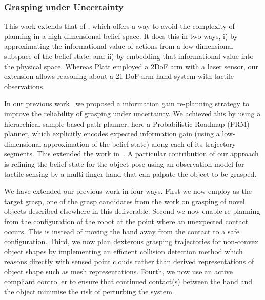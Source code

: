 
\subsubsection{Grasping under Uncertainty}
\label{sec:GraspingUncertainty}

 This work extends that of \cite{bib:platt_csail_2011}, which offers a way to avoid the complexity of planning in a high dimensional belief space. It does this in two ways, i) by approximating the informational value of actions from a low-dimensional subspace of the belief state; and ii) by embedding that informational value into the physical space. Whereas Platt employed a 2DoF arm with a laser sensor, our extension allows reasoning about a 21 DoF arm-hand system with tactile observations. 

In our previous work~\cite{bib:zito_workshop_iros2012,bib:zito_iros_2013} we proposed a information gain re-planning strategy to improve the reliability of grasping under uncertainty. We achieved this by using a hierarchical sample-based path planner, here a Probabilistic Roadmap (PRM) planner, which explicitly encodes expected information gain (using a low-dimensional approximation of the belief state) along each of its trajectory segments. This extended the work in~\cite{bib:platt_csail_2011}. A particular contribution of our approach is refining the belief state for the object pose using an observation model for tactile sensing by a multi-finger hand that can palpate the object to be grasped. 

We have extended our previous work in four ways. First we now employ as the target grasp, one of the grasp candidates from the work on grasping of novel objects described elsewhere in this deliverable. Second we now enable re-planning from the configuration of the robot at the point where an unexpected contact occurs. This is instead of moving the hand away from the contact to a safe configuration. Third, we now plan dexterous grasping trajectories for non-convex object shapes by implementing an efficient collision detection method which reasons directly with sensed point clouds rather than derived representations of object shape such as mesh representations. Fourth, we now use an active compliant controller to ensure that continued contact(s) between the hand and the object minimise the risk of perturbing the system.

